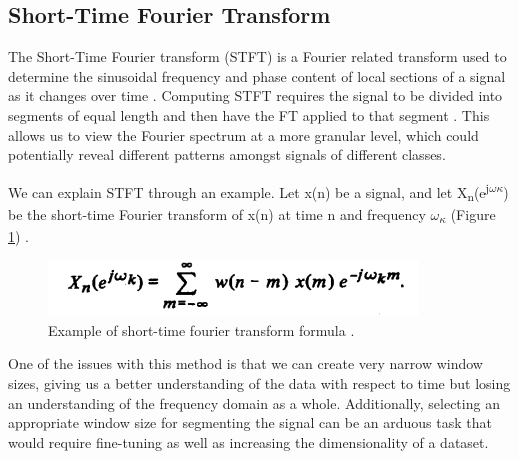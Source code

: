 \documentclass{turabian-thesis}
\begin{document}
\subsection{Short-Time Fourier Transform}
The Short-Time Fourier transform (STFT) is a Fourier related transform used to determine the sinusoidal frequency and phase content of local sections of a signal as it changes over time \cite{hill_uncertainty_nodate}.
Computing STFT requires the signal to be divided into segments of equal length and then have the FT applied to that segment \cite{allen_unified_1977}. This allows us to view the Fourier spectrum at a more granular level, which could potentially reveal different patterns amongst signals of different classes. 

We can explain STFT through an example. Let x(n) be a signal, and let X\textsubscript{n}(e\textsuperscript{j$\omega\kappa$}) be the short-time Fourier transform of x(n) at time n and frequency $\omega$\textsubscript{$\kappa$} (Figure \ref{fig:stft_example}) \cite{allen_unified_1977}. 

\begin{figure}[h]
   \begin{center}
      \includegraphics[scale=0.6]{../media/stft_eq.png}
   \end{center}
   \caption{Example of short-time fourier transform formula \cite{allen_unified_1977}.}
   \label{fig:stft_example}
\end{figure}

One of the issues with this method is that we can create very narrow window sizes, giving us a better understanding of the data with respect to time but losing an understanding of the frequency domain as a whole. Additionally, selecting an appropriate window size for segmenting the signal can be an arduous task that would require fine-tuning as well as increasing the dimensionality of a dataset.
\end{document}
